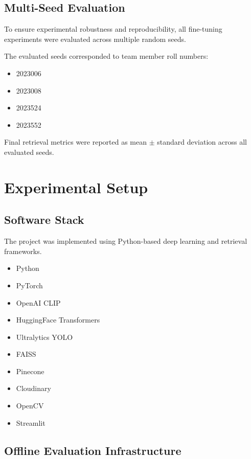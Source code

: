 \documentclass[11pt,a4paper]{article}
\begin{document}
\subsection{Multi-Seed Evaluation}

To ensure experimental robustness and reproducibility, all fine-tuning experiments were evaluated across multiple random seeds.

The evaluated seeds corresponded to team member roll numbers:

\begin{itemize}
    \item 2023006
    \item 2023008
    \item 2023524
    \item 2023552
\end{itemize}

Final retrieval metrics were reported as mean $\pm$ standard deviation across all evaluated seeds.

\section{Experimental Setup}

\subsection{Software Stack}

The project was implemented using Python-based deep learning and retrieval frameworks.

\begin{itemize}
    \item Python
    \item PyTorch
    \item OpenAI CLIP
    \item HuggingFace Transformers
    \item Ultralytics YOLO
    \item FAISS
    \item Pinecone
    \item Cloudinary
    \item OpenCV
    \item Streamlit
\end{itemize}

\subsection{Offline Evaluation Infrastructure}
\end{document}
